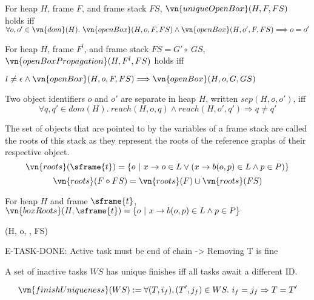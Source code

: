 \begin{definition}
    For heap $H$, frame $F$, and frame stack $FS$, $\vn{uniqueOpenBox}(H, F, FS)$ holds iff $\forall o, o' \in \vn{dom}(H).\ \vn{openBox}(H, o, F, FS) \wedge \vn{openBox}(H, o', F, FS) \Longrightarrow o = o'$
\end{definition}

\begin{definition}
    For heap $H$, frame $F^l$, and frame stack $FS = G' \circ\ GS$, $\vn{openBoxPropagation}(H, F^l, FS)$ holds iff
    
    $l \neq \epsilon \wedge \vn{openBox}(H, o, F, FS) \Longrightarrow \vn{openBox}(H, o, G, GS)$
\end{definition}




\begin{definition}[Separation]
  Two object identifiers $o$ and $o'$ are separate in heap $H$, written $sep(H, o, o')$, iff
\[
  \forall q, q' \in dom(H).\ reach(H, o, q) \wedge reach(H, o', q') \Longrightarrow q \neq q'
\]
\end{definition}

\begin{definition}[Roots]
    The set of objects that are pointed to by the variables of a frame stack are called the roots of this stack as they represent the roots of the reference graphs of their respective object.
    \[
        \vn{roots}(\sframe{t}) = \{ o\ |\ x \rightarrow o \in L \vee (x \rightarrow b(o,p) \in L \wedge p \in P)\}
    \]
    \[
        \vn{roots}(F \circ FS) = \vn{roots}(F) \cup \vn{roots}(FS)
    \]
\end{definition}

\begin{definition}
    For heap $H$ and frame $\sframe{t}$, $\vn{boxRoots}(H, \sframe{t}) = \{o\ |\ x \rightarrow b(o,p) \in L \wedge p \in P\}$
\end{definition}

    {(H, o, , FS)}



E-TASK-DONE: Active task must be end of chain -> Removing T is fine

\begin{definition}
    A set of inactive tasks $WS$ has unique finishes iff all tasks await a different ID.
    
    \[\vn{finishUniqueness}(WS) := \forall (T,i_f), (T',j_f) \in WS.\ i_f = j_f \Rightarrow T = T'\]
\end{definition}

